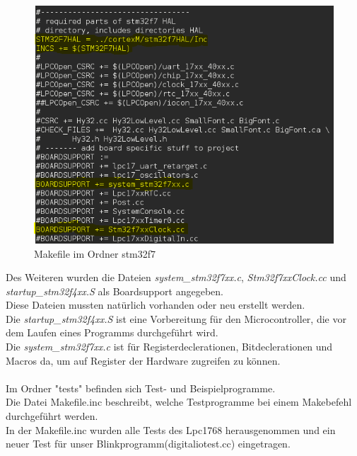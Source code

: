 \begin{figure}[h]
\begin{center}
\includegraphics[width=13cm]{grafiken/Makefile_stm32f7_1.png}
\caption{Makefile im Ordner stm32f7}
\label{Makefile_stm32f7}
\end{center}
\end{figure}
\noindent
Des Weiteren wurden die Dateien {\textit{system\_stm32f7xx.c}}, {\textit{Stm32f7xxClock.cc}} und {\textit{startup\_stm32f4xx.S}} als Boardsupport angegeben.\\
Diese Dateien mussten natürlich vorhanden oder neu erstellt werden.\\
Die {\textit{startup\_stm32f4xx.S}} ist eine Vorbereitung für den Microcontroller, die vor dem Laufen eines Programms durchgeführt wird.\\ 
Die {\textit{system\_stm32f7xx.c}} ist für Registerdeclerationen, Bitdeclerationen und Macros da, um auf Register der Hardware zugreifen zu können.\\
\\
\newpage
\noindent
Im Ordner "tests" befinden sich Test- und Beispielprogramme.\\
Die Datei Makefile.inc beschreibt, welche Testprogramme bei einem Makebefehl durchgeführt werden.\\
In der Makefile.inc wurden alle Tests des Lpc1768 herausgenommen und ein neuer Test für unser Blinkprogramm(digitaliotest.cc) eingetragen.\\
